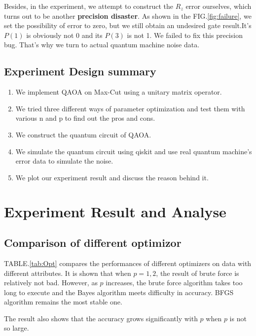 Besides, in the experiment, we attempt to construct the $R_z$ error ourselves, which turns out to be another \textbf{precision disaster}. As shown in the FIG.\ref{fig:failure}, we set the possibility of error to zero, but we still obtain an undesired gate result.It's $P(1)$ is obviously not 0 and its $P(3)$ is not 1. We failed to fix this precision bug. That's why we turn to actual quantum machine noise data.




\subsection{Experiment Design summary}
\begin{enumerate}
    \item We implement QAOA on Max-Cut using  a unitary matrix operator.
    \item We tried three different ways of parameter optimization and test them with various n and p to find out the pros and cons.
    \item We construct the quantum circuit of QAOA.
    \item We simulate the quantum circuit using qiskit and use real quantum machine's error data to simulate the noise.
    \item We plot our experiment result and discuss the reason behind it.
\end{enumerate}
\clearpage
\section{Experiment Result and Analyse}

\subsection{Comparison of different optimizor}

TABLE.\ref{tab:Opt} compares the performances of different optimizers on data with different attributes. It is shown that when $p=1, 2$, the result of brute force is relatively not bad. However, as $p$ increases, the brute force algorithm takes too long to execute and the Bayes algorithm meets difficulty in accuracy. BFGS algorithm remains the most stable one.

The result also shows that the accuracy grows significantly with $p$ when $p$ is not so large.

